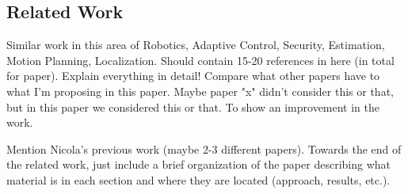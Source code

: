 




\subsection{Related Work}
\label{sec:Related Work}

Similar work in this area of Robotics, Adaptive Control, Security, Estimation, Motion Planning, Localization. Should contain 15-20 references in here (in total for paper). Explain everything in detail! Compare what other papers have to what I'm proposing in this paper. Maybe paper "x" didn't consider this or that, but in this paper we considered this or that. To show an improvement in the work. 

Mention Nicola's previous work (maybe 2-3 different papers). Towards the end of the related work, just include a brief organization of the paper describing what material is in each section and where they are located (approach, results, etc.).

